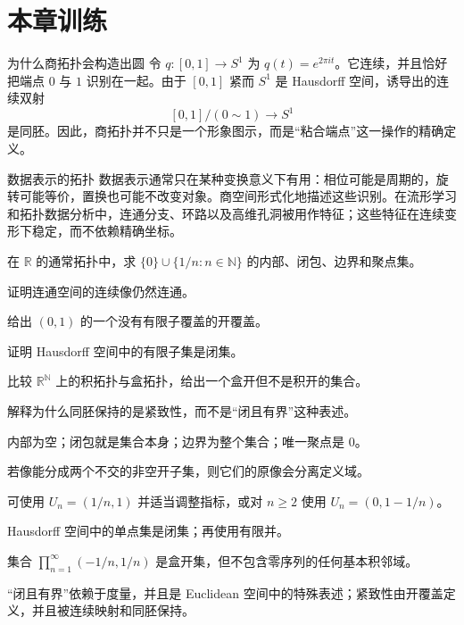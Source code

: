 \section{本章训练}

\begin{workedexample}{为什么商拓扑会构造出圆}
令 $q:[0,1]\to S^1$ 为 $q(t)=e^{2\pi it}$。它连续，并且恰好把端点 $0$ 与 $1$ 识别在一起。由于 $[0,1]$ 紧而 $S^1$ 是 Hausdorff 空间，诱导出的连续双射
\[
    [0,1]/(0\sim1)\longrightarrow S^1
\]
是同胚。因此，商拓扑并不只是一个形象图示，而是“粘合端点”这一操作的精确定义。
\end{workedexample}

\begin{applicationbox}{数据表示的拓扑}
数据表示通常只在某种变换意义下有用：相位可能是周期的，旋转可能等价，置换也可能不改变对象。商空间形式化地描述这些识别。在流形学习和拓扑数据分析中，连通分支、环路以及高维孔洞被用作特征；这些特征在连续变形下稳定，而不依赖精确坐标。
\end{applicationbox}

\begin{chapterexercises}
    \item 在 $\mathbb{R}$ 的通常拓扑中，求 $\{0\}\cup\{1/n:n\in\mathbb{N}\}$ 的内部、闭包、边界和聚点集。
    \item 证明连通空间的连续像仍然连通。
    \item 给出 $(0,1)$ 的一个没有有限子覆盖的开覆盖。
    \item 证明 Hausdorff 空间中的有限子集是闭集。
    \item 比较 $\mathbb{R}^{\mathbb{N}}$ 上的积拓扑与盒拓扑，给出一个盒开但不是积开的集合。
    \item 解释为什么同胚保持的是紧致性，而不是“闭且有界”这种表述。
\end{chapterexercises}

\begin{selectedhints}
    \item 内部为空；闭包就是集合本身；边界为整个集合；唯一聚点是 $0$。
    \item 若像能分成两个不交的非空开子集，则它们的原像会分离定义域。
    \item 可使用 $U_n=(1/n,1)$ 并适当调整指标，或对 $n\ge2$ 使用 $U_n=(0,1-1/n)$。
    \item Hausdorff 空间中的单点集是闭集；再使用有限并。
    \item 集合 $\prod_{n=1}^\infty(-1/n,1/n)$ 是盒开集，但不包含零序列的任何基本积邻域。
    \item “闭且有界”依赖于度量，并且是 Euclidean 空间中的特殊表述；紧致性由开覆盖定义，并且被连续映射和同胚保持。
\end{selectedhints}
